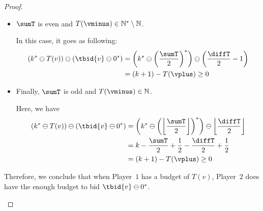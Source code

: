 \documentclass{article}\providecommand{\nequiv}{\not\equiv}\usepackage[a4paper,margin=20mm]{geometry}
\newcommand{\PO}{Player~$1$\xspace}
\newcommand{\PT}{Player~$2$\xspace}
\newcommand{\Nat}{\mathbb{N}}
\newcommand{\Natstro}{\mathbb{N}^* \setminus \mathbb{N}}
\newcommand{\predb}[1]{#1 \ominus 0^*\xspace}
\newcommand{\succInt}[1]{\left(#1\right)^*}
\DeclarePairedDelimiter{\adjustfloor}{\lfloor}{\rfloor}
\newcommand{\floor}[1]{\adjustfloor*{#1}}
\newcommand{\adjustbrac}[1]{\left(#1\right)}
\newcommand{\absolut}[1]{|#1|}
\newcommand{\half}[1]{\frac{#1}{2}}
\begin{document}
\begin{proof}
\begin{subproof}
\begin{itemize}
	In this case, we have 
	\begin{align*}
		\adjustbrac{k^* \ominus T(v)} \ominus (\predb{\tbid{v}}) &= \adjustbrac{k^* \ominus \adjustbrac{\floor{\half{\sumT}}+1}} \ominus \succInt{\floor{\half{\diffT}} -1}\\
		&= k - \floor{\half{\sumT}} - 1 - \floor{\half{\diffT}} + 1\\
		&= k+1 - \adjustbrac{\half{\sumT} + \half{\diffT}}\\
		&= \adjustbrac{k+1} - \absolut{T(\vplus)} \geq 0
	\end{align*}

	\item \(\sumT\) is even and \(T(\vminus) \in \Natstro\). 
	
	In this case, it goes as following:
	\begin{align*}
		\adjustbrac{k^* \ominus T(v)} \ominus (\predb{\tbid{v}}) &=
		\adjustbrac{k^* \ominus \succInt{\half{\sumT}}} \ominus \adjustbrac{\half{\diffT} -1}\\
		&= \adjustbrac{k+1} - T(\vplus) \geq 0
	\end{align*}

	\item Finally, \(\sumT\) is odd and \(T(\vminus) \in \Nat\). 
	
	Here, we have
	\begin{align*}
		\adjustbrac{k^* \ominus T(v)} \ominus (\predb{\tbid{v}}) &=
		\adjustbrac{k^* \ominus \succInt{\floor{\half{\sumT}}}} \ominus \floor{\half{\diffT}}\\
		&= k - \half{\sumT} + \half{1} - \half{\diffT} + \half{1}\\
		&= \adjustbrac{k+1} - T(\vplus) \geq 0
	\end{align*}
	\end{itemize}
Therefore, we conclude that when \PO has a budget of \(T(v)\), \PT does have the enough budget to bid \(\predb{\tbid{v}}\).
\end{subproof}
 

\end{proof}
\end{document}
